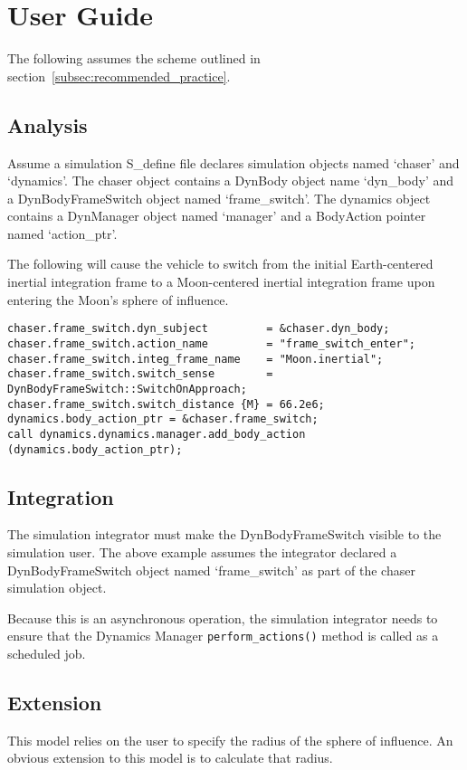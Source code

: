 %

\chapter{User Guide}\label{ch:\modelpartid:user}
The following assumes the scheme outlined in
section~\ref{subsec:recommended_practice}.

\section{Analysis}

Assume a simulation S\_define file declares simulation objects
named `chaser' and `dynamics'. The chaser object contains
a DynBody object name `dyn\_body' and
a DynBodyFrameSwitch object named `frame\_switch'. The dynamics object
contains a DynManager object named `manager' and a BodyAction pointer
named `action\_ptr'.

The following will cause the vehicle to switch from the initial Earth-centered
inertial integration frame to a Moon-centered inertial integration frame upon
entering the Moon's sphere of influence.

\begin{verbatim}
chaser.frame_switch.dyn_subject         = &chaser.dyn_body;
chaser.frame_switch.action_name         = "frame_switch_enter";
chaser.frame_switch.integ_frame_name    = "Moon.inertial";
chaser.frame_switch.switch_sense        = DynBodyFrameSwitch::SwitchOnApproach;
chaser.frame_switch.switch_distance {M} = 66.2e6;
dynamics.body_action_ptr = &chaser.frame_switch;
call dynamics.dynamics.manager.add_body_action (dynamics.body_action_ptr);
\end{verbatim}

\section{Integration}
The simulation integrator must make the DynBodyFrameSwitch visible to
the simulation user. The above example assumes the integrator declared
a DynBodyFrameSwitch object named `frame\_switch' as part of the chaser
simulation object.

Because this is an asynchronous operation, the simulation integrator needs
to ensure that the Dynamics Manager {\tt perform\_actions()} method is called
as a scheduled job.

\section{Extension}
This model relies on the user to specify the radius of the sphere of influence.
An obvious extension to this model is to calculate that radius.
